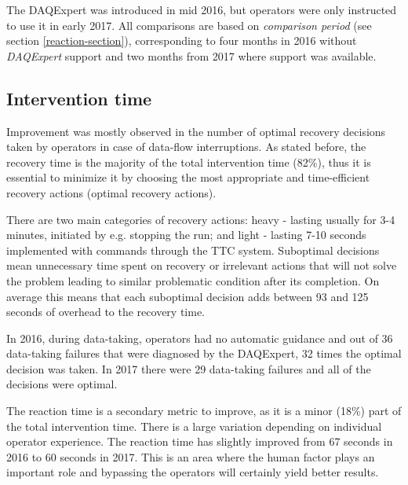 \documentclass[a4paper]{jpconf}
\begin{document}
The DAQExpert was introduced in mid 2016, but operators were only instructed to use it in early 2017. All comparisons are based on {\it comparison period} (see section \ref{reaction-section}), corresponding to four months in 2016 without {\it DAQExpert} support and two months from 2017 where support was available. 


\subsection{Intervention time}

Improvement was mostly observed in the number of optimal recovery decisions taken by operators in case of data-flow interruptions. As stated before, the recovery time is the majority of the total intervention time (82\%), thus it is essential to minimize it by choosing the most appropriate and time-efficient recovery actions (optimal recovery actions). 

There are two main categories of recovery actions: heavy - lasting usually for 3-4 minutes, initiated by e.g. stopping the run; and light - lasting 7-10 seconds implemented with commands through the TTC system. Suboptimal decisions mean unnecessary time spent on recovery or irrelevant actions that will not solve the problem leading to similar problematic condition after its completion. On average this means that each suboptimal decision adds between 93 and 125 seconds of overhead to the recovery time.

In 2016, during data-taking, operators had no automatic guidance and out of 36 data-taking failures that were diagnosed by the DAQExpert, 32 times the optimal decision was taken. In 2017 there were 29 data-taking failures and all of the decisions were optimal.

The reaction time is a secondary metric to improve, as it is a minor (18\%) part of the total intervention time. There is a large variation depending on individual operator experience. The reaction time has slightly improved from 67 seconds in 2016 to 60 seconds in 2017. This is an area where the human factor plays an important role and bypassing the operators will certainly yield better results.
\end{document}
